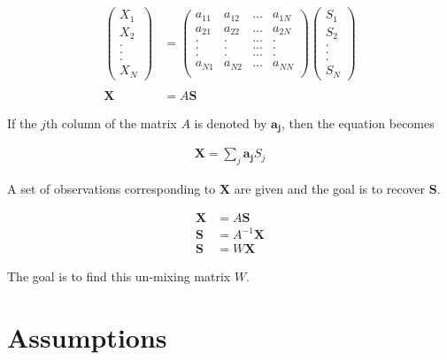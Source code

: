 \documentclass[11pt, a4paper]{article}
\begin{document}
\begin{align*}
	\begin{pmatrix} 
	X_1 \\ 
	X_2 \\ 
	. \\ 
	. \\ 
	. \\ 
	X_N 
	\end{pmatrix} &=
	\begin{pmatrix} 
	a_{11} & a_{12} & ... & a_{1N} \\ 
	a_{21} & a_{22} & ... & a_{2N} \\ 
	.      & .      & ... & .      \\
	.      & .      & ... & .      \\
	.      & .      & ... & .      \\ 
	a_{N1} & a_{N2} & ... & a_{NN} \\ 
	\end{pmatrix}
	\begin{pmatrix} 
	S_1 \\ 
	S_2 \\ 
	. \\ 
	. \\ 
	. \\ 
	S_N 
	\end{pmatrix} \\
	\\
	\boldsymbol{X} &= A \boldsymbol{S}
\end{align*}

If the $j$th column of the matrix $A$ is denoted by $\boldsymbol{a_j}$, then the equation becomes

\begin{align*}
	\boldsymbol{X} = \sum_j \boldsymbol{a_j} S_j 
\end{align*}

A set of observations corresponding to $\boldsymbol{X}$ are given and the goal is to recover $\boldsymbol{S}$.

\begin{align*}
	\boldsymbol{X} & = A \boldsymbol{S}      \\
	\boldsymbol{S} & = A^{-1} \boldsymbol{X} \\
	\boldsymbol{S} & = W \boldsymbol{X}      
\end{align*}

The goal is to find this un-mixing matrix $W$.

\section{Assumptions}
\end{document}
